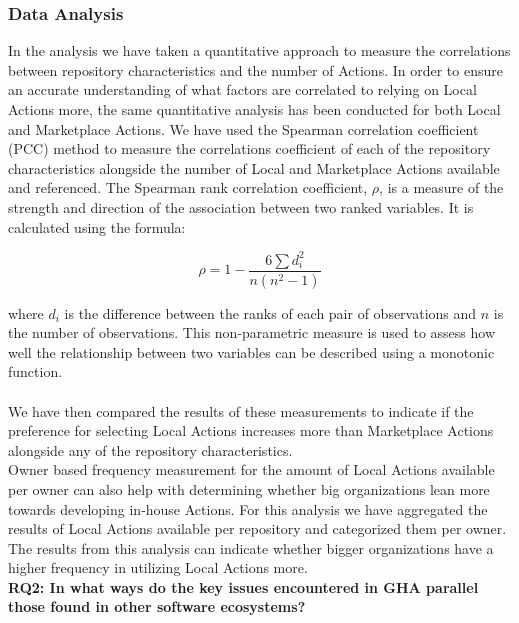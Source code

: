 \documentclass[conference]{IEEEtran}
\begin{document}
          \subsubsection{\textbf{Data Analysis}}
            In the analysis we have taken a quantitative approach to measure the correlations between repository characteristics and the number of Actions. In order to ensure an accurate understanding of what factors are correlated to relying on Local Actions more, the same quantitative analysis has been conducted for both Local and Marketplace Actions. We have used the Spearman correlation coefficient (PCC) method to measure the correlations coefficient of each of the repository characteristics alongside the number of Local and Marketplace Actions available and referenced. The Spearman rank correlation coefficient, \(\rho\), is a measure of the strength and direction of the association between two ranked variables. It is calculated using the formula:

            \begin{equation}
            \rho = 1 - \frac{6 \sum d_i^2}{n(n^2 - 1)}
            \end{equation}
            
            where \(d_i\) is the difference between the ranks of each pair of observations and \(n\) is the number of observations. This non-parametric measure is used to assess how well the relationship between two variables can be described using a monotonic function. \\             
            \\ We have then compared the results of these measurements to indicate if the preference for selecting Local Actions increases more than Marketplace Actions alongside any of the repository characteristics. \\
            Owner based frequency measurement for the amount of Local Actions available per owner can also help with determining whether big organizations lean more towards developing in-house Actions. For this analysis we have aggregated the results of Local Actions available per repository and categorized them per owner. The results from this analysis can indicate whether bigger organizations have a higher frequency in utilizing Local Actions more. \\

        \textbf{RQ2: In what ways do the key issues encountered in GHA parallel those found in other software ecosystems?}\\
\end{document}
